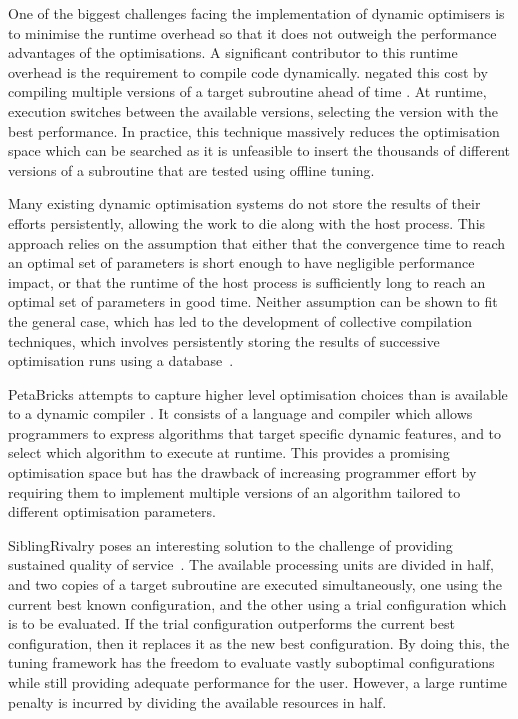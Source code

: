 One of the biggest challenges facing the implementation of dynamic
optimisers is to minimise the runtime overhead so that it does not
outweigh the performance advantages of the optimisations. A
significant contributor to this runtime overhead is the requirement to
compile code dynamically. \citeauthor{Fursin2005} negated this cost by
compiling multiple versions of a target subroutine ahead of time
\cite{Fursin2005}. At runtime, execution switches between the
available versions, selecting the version with the best
performance. In practice, this technique massively reduces the
optimisation space which can be searched as it is unfeasible to insert
the thousands of different versions of a subroutine that are tested
using offline tuning.

Many existing dynamic optimisation systems do not store the results of
their efforts persistently, allowing the work to die along with the
host process. This approach relies on the assumption that either that
the convergence time to reach an optimal set of parameters is short
enough to have negligible performance impact, or that the runtime of
the host process is sufficiently long to reach an optimal set of
parameters in good time. Neither assumption can be shown to fit the
general case, which has led to the development of collective
compilation techniques, which involves persistently storing the
results of successive optimisation runs using a
database~\cite{Fursin2010}.

PetaBricks attempts to capture higher level optimisation choices than
is available to a dynamic compiler \cite{Ansel2009a}. It consists of a
language and compiler which allows programmers to express algorithms
that target specific dynamic features, and to select which algorithm
to execute at runtime. This provides a promising optimisation space
but has the drawback of increasing programmer effort by requiring them
to implement multiple versions of an algorithm tailored to different
optimisation parameters.

SiblingRivalry poses an interesting solution to the challenge of
providing sustained quality of service~\cite{Ansel2012}. The available
processing units are divided in half, and two copies of a target
subroutine are executed simultaneously, one using the current best
known configuration, and the other using a trial configuration which
is to be evaluated. If the trial configuration outperforms the current
best configuration, then it replaces it as the new best
configuration. By doing this, the tuning framework has the freedom to
evaluate vastly suboptimal configurations while still providing
adequate performance for the user. However, a large runtime penalty is
incurred by dividing the available resources in half.

\newpage
